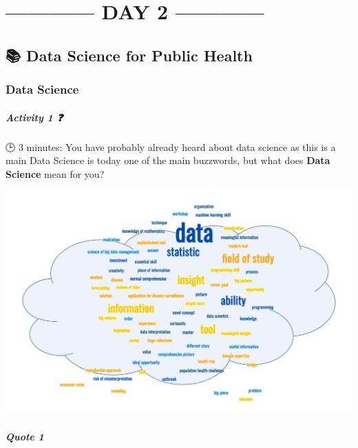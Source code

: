 \documentclass[
  letterpaper,
  DIV=11,
  numbers=noendperiod,
  oneside]{scrreprt}
\begin{document}
\part{------------ DAY 2 ------------}

\hypertarget{data-science-for-public-health}{%
\chapter{\texorpdfstring{{📚} Data Science for Public
Health}{📚 Data Science for Public Health}}\label{data-science-for-public-health}}

\hypertarget{data-science}{%
\section{Data Science}\label{data-science}}

\hypertarget{activity-1}{%
\subsubsection{\texorpdfstring{Activity 1
{❓}}{Activity 1 ❓}}\label{activity-1}}

{🕒} 3 minutes: You have probably already heard about data science as
this is a main Data Science is today one of the main buzzwords, but what
does \textbf{Data Science} mean for you?

\includegraphics{./images/paste-4EA2A26C.png}

\hypertarget{quote-1}{%
\subsubsection{\texorpdfstring{Quote 1
{💬}}{Quote 1 💬}}\label{quote-1}}
\end{document}
